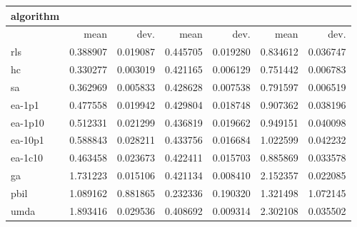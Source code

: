 \begin{tabular}{@{}l*{6}{>{{}}N{1}{2}}@{}}
\toprule
{algorithm} &  &  &  \\
\midrule
& {mean} & {dev.} & {mean} & {dev.} & {mean} & {dev.} \\
\midrule
rls & 0.388907 & 0.019087 & 0.445705 & 0.019280 & 0.834612 & 0.036747 \\
 hc & 0.330277 & 0.003019 & 0.421165 & 0.006129 & 0.751442 & 0.006783 \\
 sa & 0.362969 & 0.005833 & 0.428628 & 0.007538 & 0.791597 & 0.006519 \\
 ea-1p1 & 0.477558 & 0.019942 & 0.429804 & 0.018748 & 0.907362 & 0.038196 \\
 ea-1p10 & 0.512331 & 0.021299 & 0.436819 & 0.019662 & 0.949151 & 0.040098 \\
 ea-10p1 & 0.588843 & 0.028211 & 0.433756 & 0.016684 & 1.022599 & 0.042232 \\
 ea-1c10 & 0.463458 & 0.023673 & 0.422411 & 0.015703 & 0.885869 & 0.033578 \\
 ga & 1.731223 & 0.015106 & 0.421134 & 0.008410 & 2.152357 & 0.022085 \\
 pbil & 1.089162 & 0.881865 & 0.232336 & 0.190320 & 1.321498 & 1.072145 \\
 umda & 1.893416 & 0.029536 & 0.408692 & 0.009314 & 2.302108 & 0.035502 \\
 \bottomrule
\end{tabular}
